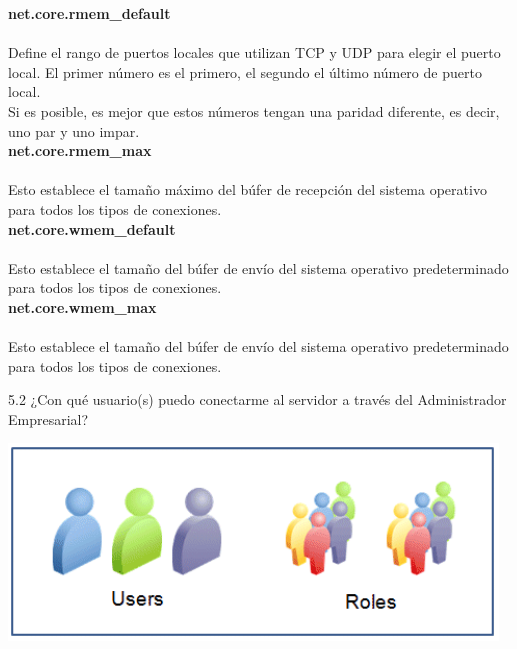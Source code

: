 {\bfseries  net.core.rmem\_default}
\\
\\Define el rango de puertos locales que utilizan TCP y UDP para elegir el puerto local. El primer número es el primero, el segundo el último número de puerto local. 
\\Si es posible, es mejor que estos números tengan una paridad diferente, es decir, uno par y uno impar. 
\\

{\bfseries  net.core.rmem\_max}
\\
\\Esto establece el tamaño máximo del búfer de recepción del sistema operativo para todos los tipos de conexiones.
\\

{\bfseries  net.core.wmem\_default}
\\
\\Esto establece el tamaño del búfer de envío del sistema operativo predeterminado para todos los tipos de conexiones.
\\

{\bfseries  net.core.wmem\_max}
\\
\\Esto establece el tamaño del búfer de envío del sistema operativo predeterminado para todos los tipos de conexiones.
\\

\newpage

5.2 ¿Con qué usuario(s) puedo conectarme al servidor a través del Administrador
Empresarial?
	\begin{center}
		\includegraphics[width=13cm]{./Imagenes/users} 
	\end{center} 

\vspace{\baselineskip}

